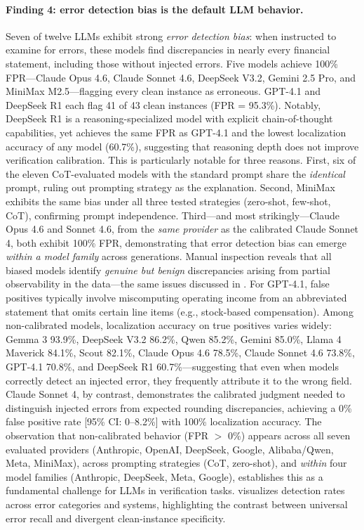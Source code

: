 \documentclass[11pt]{article}
\begin{document}
\paragraph{Finding 4: error detection bias is the default LLM behavior.}
Seven of twelve LLMs exhibit strong \emph{error detection bias}: when instructed to examine for errors, these models find discrepancies in nearly every financial statement, including those without injected errors.
Five models achieve 100\% FPR---Claude Opus 4.6, Claude Sonnet 4.6, DeepSeek V3.2, Gemini 2.5 Pro, and MiniMax M2.5---flagging every clean instance as erroneous.
GPT-4.1 and DeepSeek R1 each flag 41 of 43 clean instances (FPR = 95.3\%).
Notably, DeepSeek R1 is a reasoning-specialized model with explicit chain-of-thought capabilities, yet achieves the same FPR as GPT-4.1 and the lowest localization accuracy of any model (60.7\%), suggesting that reasoning depth does not improve verification calibration.
This is particularly notable for three reasons.
First, six of the eleven CoT-evaluated models with the standard prompt share the \emph{identical} prompt, ruling out prompting strategy as the explanation.
Second, MiniMax exhibits the same bias under all three tested strategies (zero-shot, few-shot, CoT), confirming prompt independence.
Third---and most strikingly---Claude Opus 4.6 and Sonnet 4.6, from the \emph{same provider} as the calibrated Claude Sonnet 4, both exhibit 100\% FPR, demonstrating that error detection bias can emerge \emph{within a model family} across generations.
Manual inspection reveals that all biased models identify \emph{genuine but benign} discrepancies arising from partial observability in the data---the same issues discussed in .
For GPT-4.1, false positives typically involve miscomputing operating income from an abbreviated statement that omits certain line items (e.g., stock-based compensation).
Among non-calibrated models, localization accuracy on true positives varies widely: Gemma 3 93.9\%, DeepSeek V3.2 86.2\%, Qwen 85.2\%, Gemini 85.0\%, Llama 4 Maverick 84.1\%, Scout 82.1\%, Claude Opus 4.6 78.5\%, Claude Sonnet 4.6 73.8\%, GPT-4.1 70.8\%, and DeepSeek R1 60.7\%---suggesting that even when models correctly detect an injected error, they frequently attribute it to the wrong field.
Claude Sonnet 4, by contrast, demonstrates the calibrated judgment needed to distinguish injected errors from expected rounding discrepancies, achieving a 0\% false positive rate [95\% CI: 0--8.2\%] with 100\% localization accuracy.
The observation that non-calibrated behavior (FPR $>$ 0\%) appears across all seven evaluated providers (Anthropic, OpenAI, DeepSeek, Google, Alibaba/Qwen, Meta, MiniMax), across prompting strategies (CoT, zero-shot), and \emph{within} four model families (Anthropic, DeepSeek, Meta, Google), establishes this as a fundamental challenge for LLMs in verification tasks.
 visualizes detection rates across error categories and systems, highlighting the contrast between universal error recall and divergent clean-instance specificity.
\end{document}
